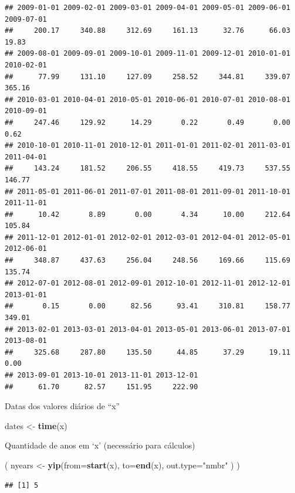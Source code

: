 \documentclass[
]{book}
\newenvironment{Shaded}{\begin{snugshade}}{\end{snugshade}}
\newcommand{\DataTypeTok}[1]{\textcolor[rgb]{0.13,0.29,0.53}{#1}}
\newcommand{\KeywordTok}[1]{\textcolor[rgb]{0.13,0.29,0.53}{\textbf{#1}}}
\newcommand{\NormalTok}[1]{#1}
\newcommand{\StringTok}[1]{\textcolor[rgb]{0.31,0.60,0.02}{#1}}
\begin{document}
\begin{verbatim}
## 2009-01-01 2009-02-01 2009-03-01 2009-04-01 2009-05-01 2009-06-01 2009-07-01 
##     200.17     340.88     312.69     161.13      32.76      66.03      19.83 
## 2009-08-01 2009-09-01 2009-10-01 2009-11-01 2009-12-01 2010-01-01 2010-02-01 
##      77.99     131.10     127.09     258.52     344.81     339.07     365.16 
## 2010-03-01 2010-04-01 2010-05-01 2010-06-01 2010-07-01 2010-08-01 2010-09-01 
##     247.46     129.92      14.29       0.22       0.49       0.00       0.62 
## 2010-10-01 2010-11-01 2010-12-01 2011-01-01 2011-02-01 2011-03-01 2011-04-01 
##     143.24     181.52     206.55     418.55     419.73     537.55     146.77 
## 2011-05-01 2011-06-01 2011-07-01 2011-08-01 2011-09-01 2011-10-01 2011-11-01 
##      10.42       8.89       0.00       4.34      10.00     212.64     105.84 
## 2011-12-01 2012-01-01 2012-02-01 2012-03-01 2012-04-01 2012-05-01 2012-06-01 
##     348.87     437.63     256.04     248.56     169.66     115.69     135.74 
## 2012-07-01 2012-08-01 2012-09-01 2012-10-01 2012-11-01 2012-12-01 2013-01-01 
##       0.15       0.00      82.56      93.41     310.81     158.77     349.01 
## 2013-02-01 2013-03-01 2013-04-01 2013-05-01 2013-06-01 2013-07-01 2013-08-01 
##     325.68     287.80     135.50      44.85      37.29      19.11       0.00 
## 2013-09-01 2013-10-01 2013-11-01 2013-12-01 
##      61.70      82.57     151.95     222.90
\end{verbatim}

Datas dos valores diários de ``x''

\begin{Shaded}
\begin{Highlighting}[]
\NormalTok{dates <-}\StringTok{ }\KeywordTok{time}\NormalTok{(x)}
\end{Highlighting}
\end{Shaded}

Quantidade de anos em `x' (necessário para cálculos)

\begin{Shaded}
\begin{Highlighting}[]
\NormalTok{( nyears <-}\StringTok{ }\KeywordTok{yip}\NormalTok{(}\DataTypeTok{from=}\KeywordTok{start}\NormalTok{(x), }\DataTypeTok{to=}\KeywordTok{end}\NormalTok{(x), }\DataTypeTok{out.type=}\StringTok{"nmbr"}\NormalTok{ ) )}
\end{Highlighting}
\end{Shaded}

\begin{verbatim}
## [1] 5
\end{verbatim}
\end{document}
